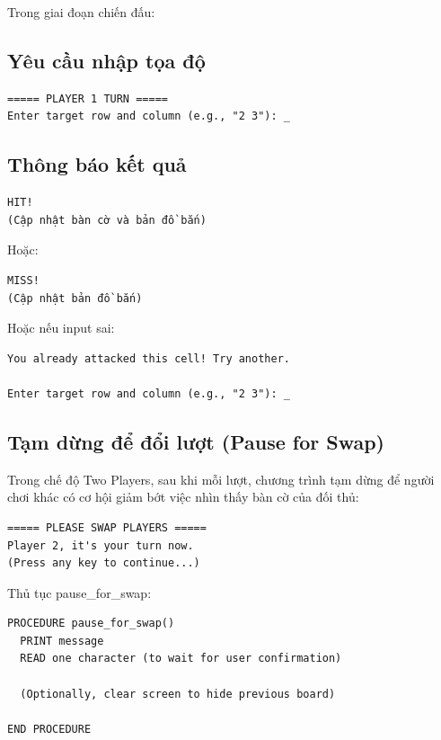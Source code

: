 Trong giai đoạn chiến đấu:

\subsection{Yêu cầu nhập tọa độ}

\begin{verbatim}
===== PLAYER 1 TURN =====
Enter target row and column (e.g., "2 3"): _
\end{verbatim}

\subsection{Thông báo kết quả}

\begin{verbatim}
HIT!
(Cập nhật bàn cờ và bản đồ bắn)
\end{verbatim}

Hoặc:

\begin{verbatim}
MISS!
(Cập nhật bản đồ bắn)
\end{verbatim}

Hoặc nếu input sai:

\begin{verbatim}
You already attacked this cell! Try another.

Enter target row and column (e.g., "2 3"): _
\end{verbatim}

\subsection{Tạm dừng để đổi lượt (Pause for Swap)}

Trong chế độ Two Players, sau khi mỗi lượt, chương trình tạm dừng để người chơi khác có cơ hội giảm bớt việc nhìn thấy bàn cờ của đối thủ:

\begin{verbatim}
===== PLEASE SWAP PLAYERS =====
Player 2, it's your turn now.
(Press any key to continue...)
\end{verbatim}

Thủ tục pause\_for\_swap:

\begin{verbatim}
PROCEDURE pause_for_swap()
  PRINT message
  READ one character (to wait for user confirmation)
  
  (Optionally, clear screen to hide previous board)

END PROCEDURE
\end{verbatim}

